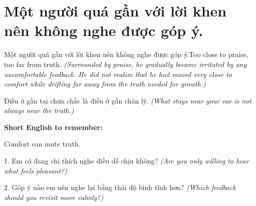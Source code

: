 \section{Một người quá gần với lời khen nên không nghe được góp ý.}
\begin{truyen}{Một người quá gần với lời khen nên không nghe được góp ý.}{Too close to praise, too far from truth.}
\textit{(Surrounded by praise, he gradually became irritated by any uncomfortable feedback. He did not realize that he had moved very close to comfort while drifting far away from the truth needed for growth.)}
\end{truyen}
\begin{baihoc}
Điều ở gần tai chưa chắc là điều ở gần chân lý.
\textit{(What stays near your ear is not always near the truth.)}
\end{baihoc}
\begin{ghinhoanh}
\textbf{Short English to remember:}

Comfort can mute truth.
\end{ghinhoanh}
\begin{tuhocnhanh}
1. Em có đang chỉ thích nghe điều dễ chịu không? \textit{(Are you only willing to hear what feels pleasant?)}

2. Góp ý nào em nên nghe lại bằng thái độ bình tĩnh hơn? \textit{(Which feedback should you revisit more calmly?)}
\end{tuhocnhanh}
\ngancach

